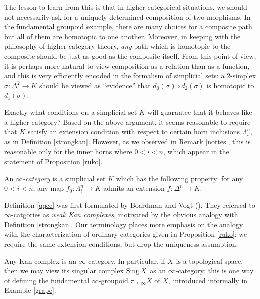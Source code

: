 \begin{1.1.2 inf-Categories}
The lesson to learn from this is that in higher-categorical
situations, we should not necessarily ask for a uniquely
determined composition of two morphisms. In the fundamental groupoid
example, there are many choices for a composite path but all of
them are homotopic to one another. Moreover, in keeping with the
philosophy of higher category theory, {\em any} path which is
homotopic to the composite should be just as good as the
composite itself. From this point of view, it is perhaps more natural to
view composition as a relation than as a function, and this is
very efficiently encoded in the formalism of simplicial sets: a
$2$-simplex $\sigma: \Delta^2 \rightarrow K$ should be viewed as
``evidence'' that $d_0(\sigma) \circ d_2(\sigma)$ is homotopic to $d_1(\sigma)$.

Exactly what conditions on a simplicial set $K$ will guarantee that it behaves like a higher category? Based on the above argument, it seems reasonable to require that $K$ satisfy an extension condition with respect to certain horn inclusions $\Lambda^n_i$, as in Definition \ref{strongkan}. However, as we observed in Remark \ref{nottes}, this is reasonable only for the inner horns where $0 < i < n$, which appear in the statement of Proposition \ref{ruko}. 

\begin{definition}\label{qqcc}
An {\it $\infty$-category} is a simplicial set $K$ which has the
following property: for any $0 < i < n$, any map $f_0: \Lambda^n_i
\rightarrow K$ admits an extension $f: \Delta^n \rightarrow K$.
\end{definition}

Definition \ref{qqcc} was first formulated by Boardman and Vogt (\cite{quasicat}). They referred to $\infty$-catgories as {\it weak
Kan complexes}, motivated by the obvious analogy with Definition \ref{strongkan}. Our terminology places more emphasis on the analogy with the characterization of ordinary categories given in Proposition \ref{ruko}: we require the same extension conditions, but drop the uniqueness assumption.

\begin{example}
Any Kan complex is an $\infty$-category. In particular, if $X$ is a topological space, then we may view its singular complex $\operatorname{Sing} X$ as an $\infty$-category: this is one way of defining the fundamental $\infty$-groupoid $\pi_{\leq \infty} X$ of $X$, introduced informally in Example \ref{grape}.
\end{example}


\end{1.1.2 inf-Categories}
